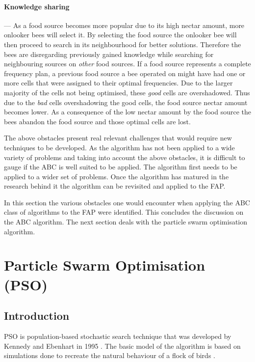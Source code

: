 \paragraph{Knowledge sharing}
--- As a food source becomes more popular due to its high nectar amount, more onlooker bees will select it. By selecting the food source the onlooker bee will then proceed to search in its neighbourhood for better solutions. Therefore the bees are disregarding previously gained knowledge while searching for neighbouring sources on \emph{other} food sources. If a food source represents a complete frequency plan, a previous food source a bee operated on might have had one or more cells that were assigned to their optimal frequencies. Due to the larger majority of the cells not being optimised, these \emph{good} cells are overshadowed. Thus due to the \emph{bad} cells overshadowing the good cells, the food source nectar amount becomes lower. As a consequence of the low nectar amount by the food source the bees abandon the food source and those optimal cells are lost.

The above obstacles present real relevant challenges that would require new techniques to be developed. As the algorithm has not been applied to a wide variety of problems and taking into account the above obstacles, it is difficult to gauge if the \gls{ABC} is well suited to be applied. The algorithm first needs to be applied to a wider set of problems. Once the algorithm has matured in the research behind it the algorithm can be revisited and applied to the \gls{FAP}.

In this section the various obstacles one would encounter when applying the \gls{ABC} class of algorithms to the \gls{FAP} were identified. This concludes the discussion on the \gls{ABC} algorithm. The next section deals with the particle swarm optimisation algorithm.
\section{Particle Swarm Optimisation (PSO)}

\label{sec:PSO}
\subsection{Introduction}
\label{sec:psointro}
PSO is population-based stochastic search technique that was developed by Kennedy and Ebenhart in 1995 \cite{PSOGABreeding}. The basic model of the algorithm is based on simulations done to recreate the natural behaviour of a flock of birds \cite{PSOSoftTesting}.

